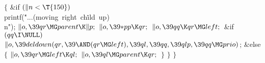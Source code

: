 ${}\{{}$\1\6
\&{if} ${}(\|n<\T{150}){}$\1\5
\\{printf}(\.{"...(moving\ right\ ch}\)\.{ild\ up)\\n"});\2\6
${}\|o,\39\\{qr}\MG\\{parent}\K\|p;{}$\6
${}\|o,\39{*}\\{pp}\K\\{qr};{}$\6
${}\|o,\39\\{qq}\K\\{qr}\MG\\{left};{}$\6
\&{if} ${}(\\{qq}\I\NULL){}$\1\5
${}\|o,\39\\{deldown}(\\{qr},\39{\AND}(\\{qr}\MG\\{left}),\39\\{ql},\39\\{qq},%
\39\\{qlp},\39\\{qq}\MG\\{prio}){}$;\2\6
\&{else}\5
${}\{{}$\1\6
${}\|o,\39\\{qr}\MG\\{left}\K\\{ql};{}$\6
${}\|o,\39\\{ql}\MG\\{parent}\K\\{qr};{}$\6
\4${}\}{}$\2\6
\4${}\}{}$\2\6
\4${}\}{}$\2\par
\fi

